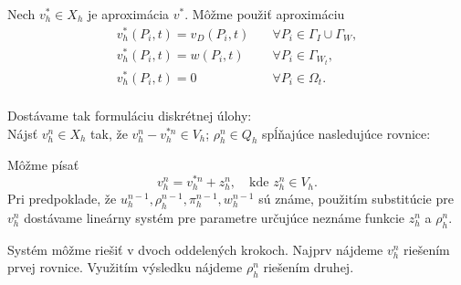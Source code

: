 Nech $v_h^* \in X_h$ je aproximácia $v^*$. Môžme použiť aproximáciu 
\[
\begin{array}{ll}
v_h^*(P_i,t)=v_D(P_i,t) \quad &\forall P_i\in\Gamma_I\cup\Gamma_W, \\
v_h^*(P_i,t)=w(P_i,t) \quad &\forall P_i\in\Gamma_{W_t}, \\
v_h^*(P_i,t)=0 \quad &\forall P_i\in\Omega_t. \\
\end{array}
\]


Dostávame tak formuláciu diskrétnej úlohy:\\
Nájsť $v_h^n \in X_h$ tak, že $v_h^n - v_h^{*n} \in V_h$; $\rho_h^n \in Q_h$
spĺňajúce nasledujúce rovnice:


Môžme písať 
$$v_h^n=v_h^{*n}+z_h^n, \quad \mbox{kde } z_h^n \in V_h.$$
Pri predpoklade, že $u_h^{n-1},\rho_h^{n-1},\pi_h^{n-1},w_h^{n-1}$ sú známe,
použitím substitúcie pre $v_h^n$ dostávame lineárny systém pre parametre
určujúce neznáme funkcie $z_h^n$ a $\rho_h^n$.

Systém  môžme riešiť v dvoch oddelených krokoch.
Najprv nájdeme $v_h^n$ riešením prvej rovnice. Využitím výsledku nájdeme
$\rho_h^n$ riešením druhej.
